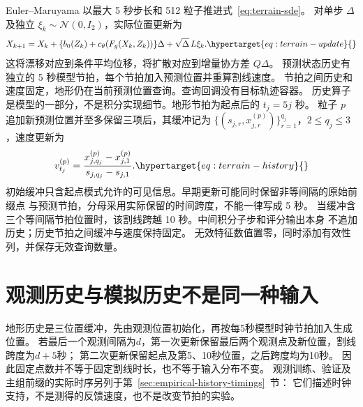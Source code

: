 Euler--Maruyama 以最大 5 秒步长和 512 粒子推进式~\eqref{eq:terrain-sde}。
对单步 \(\Delta\) 及独立 \(\xi_k\sim\mathcal N(0,I_2)\)，实际位置更新为
\begin{equation}
X_{k+1}=X_k+\{b_0(Z_k)+c_\theta(F_g(X_k,Z_k))\}\Delta+\sqrt{\Delta}\,L\xi_k.
\label{eq:terrain-update}\hypertarget{eq:terrain-update}{}
\end{equation}
这将漂移对应到条件平均位移，将扩散对应到增量协方差 \(Q\Delta\)。
预测状态历史有独立的 5 秒模型节拍，每个节拍加入预测位置并重算割线速度。
节拍之间历史和速度固定，地形仍在当前预测位置查询。查询回调没有目标轨迹容器。
历史算子是模型的一部分，不是积分实现细节。地形节拍为起点后的 \(t_j=5j\) 秒。
粒子 \(p\) 追加新预测位置并至多保留三项后，其缓冲记为
\(\{(s_{j,r},x^{(p)}_{j,r})\}_{r=1}^{q_j}\)，\(2\le q_j\le3\)，速度更新为
\begin{equation}
v^{(p)}_{t_j}=\frac{x^{(p)}_{j,q_j}-x^{(p)}_{j,1}}
                        {s_{j,q_j}-s_{j,1}}.
\label{eq:terrain-history}\hypertarget{eq:terrain-history}{}
\end{equation}
初始缓冲只含起点模式允许的可见信息。早期更新可能同时保留非等间隔的原始前缀点
与预测节拍，分母采用实际保留的时间跨度，不能一律写成 5 秒。
当缓冲含三个等间隔节拍位置时，该割线跨越 10 秒。中间积分子步和评分输出本身
不追加历史；历史节拍之间缓冲与速度保持固定。
无效特征数值置零，同时添加有效性列，并保存无效查询数量。


\section{观测历史与模拟历史不是同一种输入}
\label{sec:history-feedback}\hypertarget{sec:history-feedback}{}
地形历史是三位置缓冲，先由观测位置初始化，再按每5秒模型时钟节拍加入生成位置。
若最后一个观测间隔为\(d\)，第一次更新保留最后两个观测点及新位置，割线跨度为\(d+5\)秒；
第二次更新保留起点及第5、10秒位置，之后跨度均为10秒。
因此固定点数并不等于固定割线时长，也不等于输入分布不变。
观测训练、验证及主组前缀的实际时序另列于第~\ref{sec:empirical-history-timings}~节：
它们描述时钟支持，不是测得的反馈速度，也不是改变节拍的实验。


